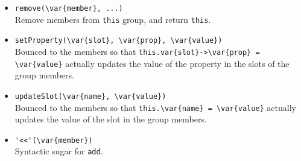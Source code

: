 \begin{itemize}
\item \lstinline|remove(\var{member}, ...)|\\
  Remove members from \lstinline|this| group, and return
  \lstinline|this|.

\item \lstinline|setProperty(\var{slot}, \var{prop}, \var{value})|\\
  Bounced to the members so that
  \lstinline|this.var{slot}->\var{prop} = \var{value}|
  actually updates the value of the property 
  in the slots  of the group members.

\item \lstinline|updateSlot(\var{name}, \var{value})|\\
  Bounced to the members so that
  \lstinline|this.\var{name} = \var{value}|
  actually updates the value of the slot  in
  the group members.

\item \lstinline|'<<'(\var{member})|\\
  Syntactic sugar for \lstinline|add|.
\end{itemize}

